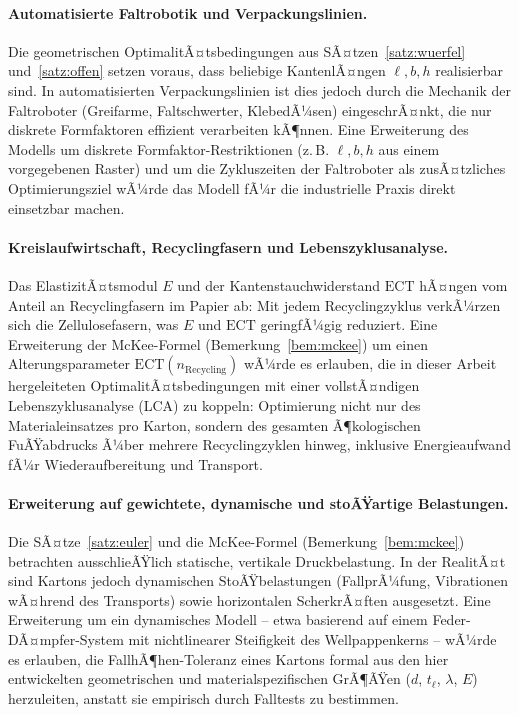 ﻿\documentclass[a4paper,12pt]{article}
\theoremstyle{definition}
\begin{document}
\paragraph{Automatisierte Faltrobotik und Verpackungslinien.}
Die geometrischen OptimalitÃ¤tsbedingungen aus SÃ¤tzen~\ref{satz:wuerfel}
und~\ref{satz:offen} setzen voraus, dass beliebige KantenlÃ¤ngen $\ell, b, h$
realisierbar sind. In automatisierten Verpackungslinien ist dies jedoch durch
die Mechanik der Faltroboter (Greifarme, Faltschwerter, KlebedÃ¼sen)
eingeschrÃ¤nkt, die nur diskrete Formfaktoren effizient verarbeiten kÃ¶nnen. Eine
Erweiterung des Modells um diskrete Formfaktor-Restriktionen (z.\,B.
$\ell, b, h$ aus einem vorgegebenen Raster) und um die
Zykluszeiten der Faltroboter als zusÃ¤tzliches Optimierungsziel wÃ¼rde das Modell
fÃ¼r die industrielle Praxis direkt einsetzbar machen.

\paragraph{Kreislaufwirtschaft, Recyclingfasern und Lebenszyklusanalyse.}
Das ElastizitÃ¤tsmodul $E$ und der Kantenstauchwiderstand $\mathrm{ECT}$ hÃ¤ngen
vom Anteil an Recyclingfasern im Papier ab: Mit jedem Recyclingzyklus verkÃ¼rzen
sich die Zellulosefasern, was $E$ und $\mathrm{ECT}$ geringfÃ¼gig reduziert. Eine
Erweiterung der McKee-Formel (Bemerkung~\ref{bem:mckee}) um einen
Alterungsparameter $\mathrm{ECT}(n_{\text{Recycling}})$ wÃ¼rde es erlauben, die
in dieser Arbeit hergeleiteten OptimalitÃ¤tsbedingungen mit einer vollstÃ¤ndigen
Lebenszyklusanalyse (LCA) zu koppeln: Optimierung nicht nur des
Materialeinsatzes pro Karton, sondern des gesamten Ã¶kologischen FuÃŸabdrucks Ã¼ber
mehrere Recyclingzyklen hinweg, inklusive Energieaufwand fÃ¼r Wiederaufbereitung
und Transport.

\paragraph{Erweiterung auf gewichtete, dynamische und stoÃŸartige Belastungen.}
Die SÃ¤tze~\ref{satz:euler} und die McKee-Formel (Bemerkung~\ref{bem:mckee})
betrachten ausschlieÃŸlich statische, vertikale Druckbelastung. In der RealitÃ¤t
sind Kartons jedoch dynamischen StoÃŸbelastungen (FallprÃ¼fung, Vibrationen
wÃ¤hrend des Transports) sowie horizontalen ScherkrÃ¤ften ausgesetzt. Eine
Erweiterung um ein dynamisches Modell -- etwa basierend auf einem
Feder-DÃ¤mpfer-System mit nichtlinearer Steifigkeit des Wellpappenkerns --
wÃ¼rde es erlauben, die FallhÃ¶hen-Toleranz eines Kartons formal aus den hier
entwickelten geometrischen und materialspezifischen GrÃ¶ÃŸen ($d$, $t_\ell$,
$\lambda$, $E$) herzuleiten, anstatt sie empirisch durch Falltests zu
bestimmen.
\end{document}
